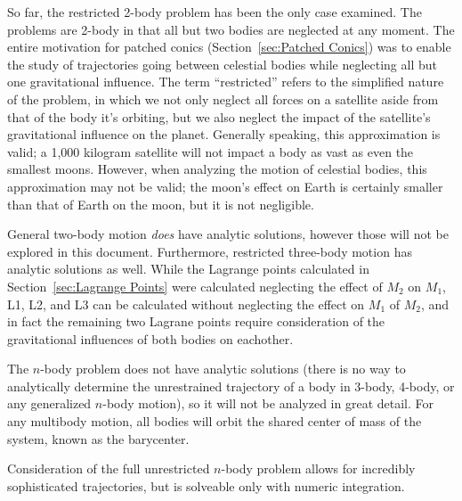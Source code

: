 \documentclass[../basicOrbitalDynamics.tex]{subfiles}
\begin{document}
So far, the restricted 2-body problem has been the only case examined. The problems are 2-body in that all but two bodies are neglected at any moment. The entire motivation for patched conics (Section~\ref{sec:Patched Conics}) was to enable the study of trajectories going between celestial bodies while neglecting all but one gravitational influence. The term ``restricted'' refers to the simplified nature of the problem, in which we not only neglect all forces on a satellite aside from that of the body it's orbiting, but we also neglect the impact of the satellite's gravitational influence on the planet. Generally speaking, this approximation is valid; a 1,000 kilogram satellite will not impact a body as vast as even the smallest moons. However, when analyzing the motion of celestial bodies, this approximation may not be valid; the moon's effect on Earth is certainly smaller than that of Earth on the moon, but it is not negligible. 

General two-body motion \textit{does} have analytic solutions, however those will not be explored in this document. Furthermore, restricted three-body motion has analytic solutions as well. While the Lagrange points calculated in Section~\ref{sec:Lagrange Points} were calculated neglecting the effect of $M_2$ on $M_1$, L1, L2, and L3 can be calculated without neglecting the effect on $M_1$ of $M_2$, and in fact the remaining two Lagrane points require consideration of the gravitational influences of both bodies on eachother.

The $n$-body problem does not have analytic solutions (there is no way to analytically determine the unrestrained trajectory of a body in 3-body, 4-body, or any generalized $n$-body motion), so it will not be analyzed in great detail. For any multibody motion, all bodies will orbit the shared center of mass of the system, known as the barycenter.

Consideration of the full unrestricted $n$-body problem allows for incredibly sophisticated trajectories, but is solveable only with numeric integration.
\end{document}
